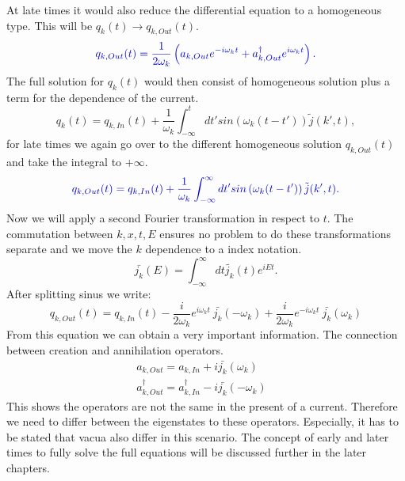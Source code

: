 \documentclass[12pt, titlepage]{article}
\begin{document}
At late times it would also reduce the differential equation to a homogeneous type. This will be $ q_{k}(t) \rightarrow q_{k,Out}(t) $. 
\begin{equation}\label{q_Out_operators}
 \textcolor[RGB]{0,0,204}{
 q_{k,Out}(t) 
  =
  \dfrac{1}{2\omega_{k}}\left(
	a_{k,Out} 
	e^{-i\omega_{k}t}
	+
	a^{\dagger}_{k,Out}  
	e^{i\omega_{k}t}
  \right) 
  .}
\end{equation}
The full solution for $ q_k(t) $ would then consist of homogeneous solution plus a term for the dependence of the current.
\begin{equation}
 q_{k}(t) 
  =
  q_{k,In}(t) 
  +
    \dfrac{1}{\omega_{k}}
    \int^{t}_{-\infty}
    dt'
    sin\left(\omega_{k}(t-t') \right) \tilde{j}(k',t),
\end{equation}
for late times we again go over to the different homogeneous solution $ q_{k,Out}(t)  $ and take the integral to $ +\infty $.
\begin{equation}\label{q_Out_by_q_In}
 \textcolor[RGB]{0,0,204}{
q_{k,Out}(t) 
  =
  q_{k,In}(t) 
  +
    \dfrac{1}{\omega_{k}}
    \int^{\infty}_{-\infty}
    dt'
    sin\left(\omega_{k}(t-t') \right) \tilde{j}(k',t)
  .}
\end{equation}
Now we will apply a second Fourier transformation in respect to $ t $. The commutation between $ k,x,t,E $ ensures no problem to do these transformations separate and we move the $ k $ dependence to a index notation.
\begin{equation}
\bar{j_{k}}(E)= \int^{\infty}_{-\infty}dt \tilde{j_{k}}(t) e^{iEt}.
\end{equation}
After splitting sinus we write:
\begin{equation}
q_{k,Out}(t) 
  =
  q_{k,In}(t) 
  -
  	\dfrac{i}{2\omega_{k}}e^{i\omega_{k}t}\
  	\bar{j_{k}}(-\omega_{k})
  +
  	\dfrac{i}{2\omega_{k}}e^{-i\omega_{k}t}\
  	\bar{j_{k}}(\omega_{k})
\end{equation}
From this equation we can obtain a very important information. The connection between creation and annihilation operators.
\begin{subequations}
\begin{align}
a_{k,Out}=  a_{k,In}+i\bar{j_{k}}(\omega_{k})  
&\\
a^{\dagger}_{k,Out} = a^{\dagger}_{k,In}-i\bar{j_{k}}(-\omega_{k})  
\end{align}
\end{subequations}
This shows the operators are not the same in the present of a current. Therefore we need to differ between the eigenstates to these operators. Especially, it has to be stated that vacua also differ in this scenario. The concept of early and later times to fully solve the full equations will be discussed further in the later chapters.
\end{document}
